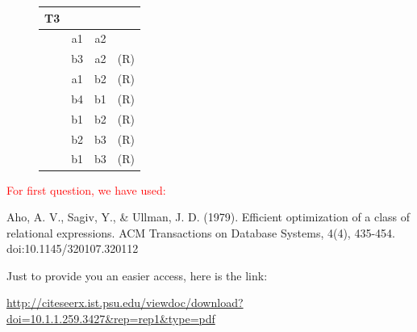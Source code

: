 \documentclass[10pt]{article}
\begin{document}
\begin{figure}[!htb]
\begin{minipage}[t]{0.2\textwidth}
\begin{table}[H]
{\begin{tabular}{c c c c}
						T3 	& 		& 		& \\
						\hline
						&a1& a2&\\
						\hline
						&b3& a2& (R)\\
						&a1& b2& (R)\\
						&b4& b1& (R)\\
						&b1& b2& (R)\\
						&b2& b3& (R)\\
						&b1& b3& (R)\\
					\end{tabular}
				}
				\end{table}
			\end{minipage}
		\end{figure}
		
		\textcolor{red}
		{
			For first question, we have used:\\
		}
		
		Aho, A. V., Sagiv, Y., \& Ullman, J. D. (1979). Efficient optimization of a class of relational expressions. ACM Transactions on Database Systems, 4(4), 435-454. doi:10.1145/320107.320112
		\bigskip
		
		Just to provide you an easier access, here is the link:
		
		\href{url}{http://citeseerx.ist.psu.edu/viewdoc/download?doi=10.1.1.259.3427\&rep=rep1\&type=pdf}
		
\end{document}
